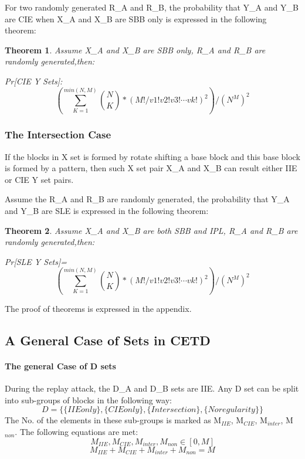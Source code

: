 \documentclass{article}
\newtheorem{theorem}{Theorem}[section]
\begin{document}
For two randomly generated R\_A and R\_B, the probability that Y\_A and Y\_B are CIE when X\_A and X\_B are SBB only is expressed in the following theorem:
\begin{theorem}
Assume X\_A and X\_B are SBB only, R\_A and R\_B are randomly generated,then:

Pr[CIE Y Sets]:
\begin{displaymath}
(\sum_{K=1}^{min(N,M)} \binom{N}{K} * (M!/v1!v2!v3! \cdots vk!) ^ 2 )/(N^M)^2
\end{displaymath}

\end{theorem}

\subsubsection{The Intersection Case}
If the blocks in X set is formed by rotate shifting a base block and this base block is formed by a pattern, then such X set pair X\_A and X\_B can result either IIE or CIE Y set pairs.

Assume the R\_A and R\_B are randomly generated, the probability that Y\_A and Y\_B are SLE is expressed in the following theorem:
\begin{theorem}
Assume X\_A and X\_B are both SBB and IPL, R\_A and R\_B are randomly generated,then:

Pr[SLE Y Sets]=
\begin{displaymath}
(\sum_{K=1}^{min(N,M)} \binom{N}{K} * (M!/v1!v2!v3! \cdots vk!) ^ 2 )/(N^M)^2
\end{displaymath}
\end{theorem}
The proof of theorems is expressed in the appendix.

\subsection{A General Case of Sets in CETD}
\paragraph{The general Case of D sets}
During the replay attack, the D\_A and D\_B sets are IIE. Any D set can be split into sub-groups of blocks in the following way:
\begin{equation}
D = \{\{IIE only\},\{CIE only\},\{Intersection\},\{No regularity\}\}
\end{equation}
The No. of the elements in these sub-groups is marked as M$_{IIE}$, M$_{CIE}$, M$_{inter}$, M$_{non}$. The following equations are met:
\begin{equation}
M_{IIE}, M_{CIE}, M_{inter}, M_{non} \in [0,M]
\end{equation}
\begin{equation}
M_{IIE}+ M_{CIE}+M_{inter}+ M_{non} = M
\end{equation}
\end{document}
